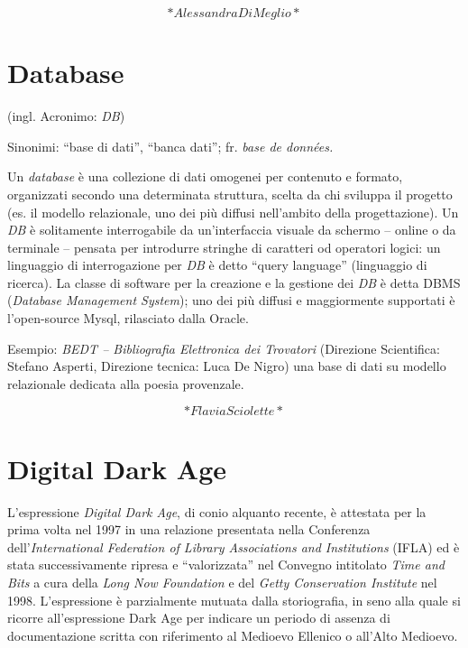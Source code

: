 \documentclass[
  b5paper,
  twoside,
  11pt,
  chapterprefix=false,
  bibliography=totocnumbered,
  parskip=0]{scrbook}
\begin{document}
\[*Alessandra Di Meglio*\]

\hypertarget{database}{%
\chapter{Database}\label{database}}

(ingl. Acronimo: \emph{DB})

Sinonimi: \enquote{base di dati}, \enquote{banca dati}; fr. \emph{base de données.}

Un \emph{database} è una collezione di dati omogenei per contenuto e formato,
organizzati secondo una determinata struttura, scelta da chi sviluppa il
progetto (es. il modello relazionale, uno dei più diffusi nell'ambito
della progettazione). Un \emph{DB} è solitamente interrogabile da
un'interfaccia visuale da schermo -- online o da terminale -- pensata
per introdurre stringhe di caratteri od operatori logici: un linguaggio
di interrogazione per \emph{DB} è detto \enquote{query language} (linguaggio di
ricerca). La classe di software per la creazione e la gestione dei \emph{DB}
è detta DBMS (\emph{Database Management System}); uno dei più diffusi e
maggiormente supportati è l'open-source Mysql, rilasciato dalla Oracle.

Esempio: \emph{BEDT -- Bibliografia Elettronica dei Trovatori} (Direzione
Scientifica: Stefano Asperti, Direzione tecnica: Luca De Nigro) una base
di dati su modello relazionale dedicata alla poesia provenzale.

\[*Flavia Sciolette*\]

\hypertarget{digital-dark-age}{%
\chapter{Digital Dark Age}\label{digital-dark-age}}

L'espressione \emph{Digital Dark Age}, di conio alquanto recente, è attestata
per la prima volta nel 1997 in una relazione presentata nella Conferenza
dell'\emph{International Federation of Library Associations and Institutions}
(IFLA) ed è stata successivamente ripresa e \enquote{valorizzata} nel Convegno
intitolato \emph{Time and Bits} a cura della \emph{Long Now Foundation} e del
\emph{Getty Conservation Institute} nel 1998. L'espressione è parzialmente
mutuata dalla storiografia, in seno alla quale si ricorre
all'espressione Dark Age per indicare un periodo di assenza di
documentazione scritta con riferimento al Medioevo Ellenico o all'Alto
Medioevo.
\end{document}

